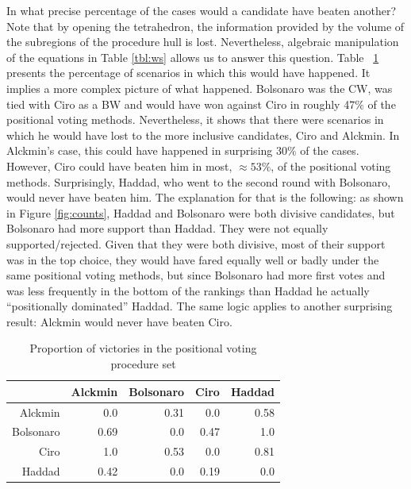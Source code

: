 \documentclass[hidelinks,11pt]{article} \usepackage[utf8]{inputenc}
\begin{document}
In what precise percentage of the cases would a candidate have beaten another?
Note that by opening the tetrahedron, the information provided by the volume of
the subregions of the procedure hull is lost. Nevertheless, algebraic
manipulation of the equations in Table \ref{tbl:ws} allows us to answer this
question. Table ~\ref{tbl:ctn} presents the percentage of scenarios in which this
would have happened. It implies a more complex picture of what happened.
Bolsonaro was the CW, was tied with Ciro as a BW and would have won against Ciro
in roughly 47\(\%\) of the positional voting methods. Nevertheless, it shows
that there were scenarios in which he would have lost to the more inclusive
candidates, Ciro and Alckmin. In Alckmin's case, this could have happened in
surprising \(30\%\) of the cases. However, Ciro could have beaten him in most,
\(\approx 53\%\), of the positional voting methods. Surprisingly, Haddad, who
went to the second round with Bolsonaro, would never have beaten him. The
explanation for that is the following: as shown in Figure \ref{fig:counts},
Haddad and Bolsonaro were both divisive candidates, but Bolsonaro had more
support than Haddad. They were not equally supported/rejected. Given that they
were both divisive, most of their support was in the top choice, they would have
fared equally well or badly under the same positional voting methods, but since
Bolsonaro had more first votes and was less frequently in the bottom of the
rankings than Haddad he actually ``positionally dominated'' Haddad. The same
logic applies to another surprising result: Alckmin would never have beaten Ciro.


\begin{table}[H]
  \centering
  \begin{tabular}{rrrrr}
    \hline
     & Alckmin & Bolsonaro & Ciro & Haddad \\
    \hline
    Alckmin & 0.0 & 0.31 & 0.0 & 0.58 \\
    Bolsonaro & 0.69 & 0.0 & 0.47 & 1.0 \\
    Ciro & 1.0 & 0.53 & 0.0 & 0.81 \\
    Haddad & 0.42 & 0.0 & 0.19 & 0.0 \\\hline\hline
  \end{tabular}
   \caption{Proportion of victories in the positional voting procedure set}
\label{tbl:ctn}
\end{table}
\end{document}
